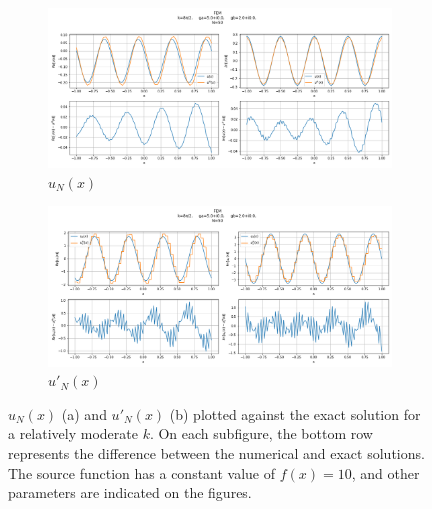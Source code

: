 \begin{figure}[h]
    \label{fig:femMidfreqN050}
    \centering
    \begin{subfigure}[b]{0.9\textwidth}
        \includegraphics[width=\textwidth]{img/FEM-Const-MidFreq-N0050-sol.png}
        \caption{$u_N(x)$}
    \end{subfigure}
    \vfill
    \begin{subfigure}[b]{0.9\textwidth}
        \includegraphics[width=\textwidth]{img/FEM-Const-MidFreq-N0050-der.png}
        \caption{$u'_N(x)$}
    \end{subfigure}
    \caption{$u_N(x)$ (a) and $u'_N(x)$ (b) plotted against the exact solution for a relatively moderate $k$.
    On each subfigure, the bottom row represents the difference between the numerical and exact solutions. The source
    function has a constant value of $f(x)=10$, and other parameters are indicated on the figures.}
\end{figure}
